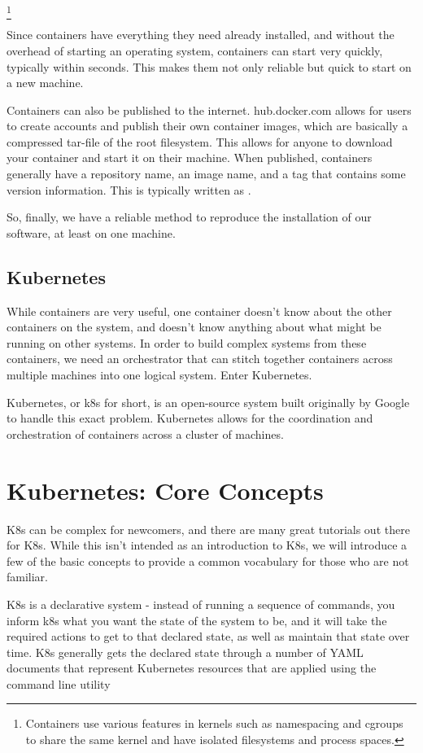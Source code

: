 \documentclass[11pt,twoside]{article}
\begin{document}
\footnote{Containers use various features in kernels such as namespacing and cgroups
to share the same kernel and have isolated filesystems and process spaces.}

Since containers have everything they need already installed, and without the overhead of
starting an operating system, containers can start very quickly, typically within seconds.
This makes them not only reliable but quick to start on a new machine.

Containers can also be published to the internet.  hub.docker.com allows for users to
create accounts and publish their own container images, which are basically a compressed
tar-file of the root filesystem.  This allows for anyone to download your container and
start it on their machine.  When published, containers generally have a repository name,
an image name, and a tag that contains some version information.  This is typically
written as .

So, finally, we have a reliable method to reproduce the installation of our software,
at least on one machine.

\subsection{Kubernetes}

While containers are very useful, one container doesn't know about the other containers
on the system, and doesn't know anything about what might be running on other systems.
In order to build complex systems from these containers, we need an orchestrator that
can stitch together containers across multiple machines into one logical system.  Enter
Kubernetes.

Kubernetes, or k8s for short, is an open-source system built originally by Google to handle this exact
problem.  Kubernetes allows for the coordination and orchestration of containers across
a cluster of machines.

\section{Kubernetes: Core Concepts}

K8s can be complex for newcomers, and there are many great tutorials out there
for K8s.  While this isn't intended as an introduction to K8s, we will
introduce a few of the basic concepts to provide a common vocabulary for
those who are not familiar.

K8s is a declarative system - instead of running
a sequence of commands, you inform k8s what you want the state of the system to be,
and it will take the required actions to get to that declared state, as well as maintain
that state over time.  K8s generally gets the declared state through a number of YAML documents
that represent Kubernetes resources that are applied using the command line utility 
\end{document}
